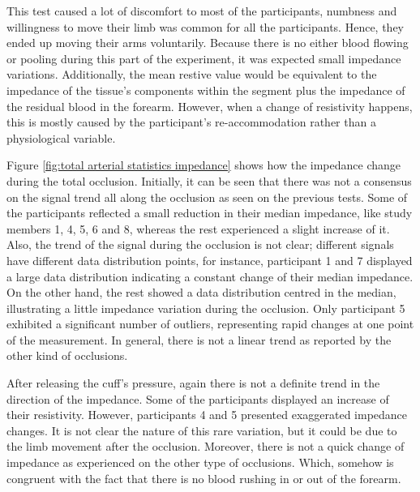 This test caused a lot of discomfort to most of the participants, numbness and willingness to move their limb was common for all the participants. Hence, they ended up moving their arms voluntarily. Because there is no either blood flowing or pooling during this part of the experiment, it was expected small impedance variations. Additionally, the mean restive value would be equivalent to the impedance of the tissue's components within the segment plus the impedance of the residual blood in the forearm. However, when a change of resistivity happens, this is mostly caused by the participant's re-accommodation rather than a physiological variable. 

Figure \ref{fig:total arterial statistics impedance} shows how the impedance change during the total occlusion. Initially, it can be seen that there was not a consensus on the signal trend all along the occlusion as seen on the previous tests.  Some of the participants reflected a small reduction in their median impedance, like study members 1,  4, 5, 6 and 8, whereas the rest experienced a slight increase of it. Also, the trend of the signal during the occlusion is not clear; different signals have different data distribution points, for instance,  participant 1 and 7 displayed a large data distribution indicating a constant change of their median impedance. On the other hand, the rest showed a data distribution centred in the median, illustrating a little impedance variation during the occlusion. Only participant 5 exhibited a significant number of outliers, representing rapid changes at one point of the measurement. In general, there is not a linear trend as reported by the other kind of occlusions. 

After releasing the cuff's pressure, again there is not a definite trend in the direction of the impedance. Some of the participants displayed an increase of their resistivity. However, participants 4 and 5 presented exaggerated impedance changes. It is not clear the nature of this rare variation, but it could be due to the limb movement after the occlusion. Moreover, there is not a quick change of impedance as experienced on the other type of occlusions. Which, somehow is congruent with the fact that there is no blood rushing in or out of the forearm.

